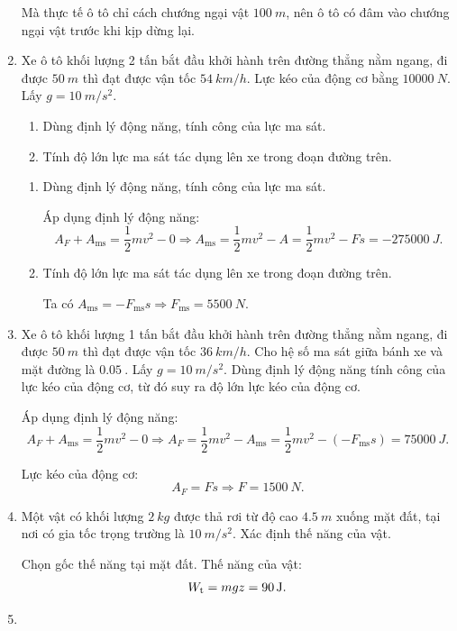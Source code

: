 \begin{enumerate}[label=\bfseries Câu \arabic*:]
{		Mà thực tế ô tô chỉ cách chướng ngại vật $\SI{100}{m}$, nên ô tô có đâm vào chướng ngại vật trước khi kịp dừng lại.
	}
	\item {}
	
	
	{
		Xe ô tô khối lượng 2 tấn bắt đầu khởi hành trên đường thẳng nằm ngang, đi được $\SI{50}{m}$ thì đạt được vận tốc $\SI{54}{km/h}$. Lực kéo của động cơ bằng $\SI{10000}{N}$. Lấy $g=\SI{10}{m/s^2}$.
		\begin{enumerate}[label=\alph*)]
			\item Dùng định lý động năng, tính công của lực ma sát.
			\item Tính độ lớn lực ma sát tác dụng lên xe trong đoạn đường trên.
		\end{enumerate}
	}
	
	\hideall
	{	
		\begin{enumerate}[label=\alph*)]
			\item Dùng định lý động năng, tính công của lực ma sát.
			
			Áp dụng định lý động năng:
			$$A_F + A_\text{ms} = \dfrac{1}{2}mv^2 - 0 \Rightarrow A_\text{ms} = \dfrac{1}{2}mv^2 - A= \dfrac{1}{2} mv^2 - Fs= \SI{-275000}{J}.$$
			\item Tính độ lớn lực ma sát tác dụng lên xe trong đoạn đường trên.
			
			Ta có $A_\text{ms} = -F_\text{ms} s \Rightarrow F_\text{ms} = \SI{5500}{N}$.
		\end{enumerate}
	}
	\item {}
	
	
	{
			Xe ô tô khối lượng 1 tấn bắt đầu khởi hành trên đường thẳng nằm ngang, đi được $\SI{50}{m}$ thì đạt được vận tốc $\SI{36}{km/h}$. Cho hệ số ma sát giữa bánh xe và mặt đường là $\SI{0.05}{}$. Lấy $g=\SI{10}{m/s^2}$. Dùng định lý động năng tính công của lực kéo của động cơ, từ đó suy ra độ lớn lực kéo của động cơ.
	}
	
	\hideall
	{	
		Áp dụng định lý động năng:
		$$A_F + A_\text{ms} = \dfrac{1}{2}mv^2 - 0 \Rightarrow A_F = \dfrac{1}{2}mv^2 - A_\text{ms} = \dfrac{1}{2}mv^2 - (-F_\text{ms}s) = \SI{75000}{J}.$$
		
		Lực kéo của động cơ:
		$$A_F=Fs \Rightarrow F = \SI{1500}{N}.$$
	}
	\item {}
	
	
	{
		Một vật có khối lượng $\SI{2}{kg}$ được thả rơi từ độ cao $\SI{4.5}{m}$ xuống mặt đất, tại nơi có gia tốc trọng trường là $\SI{10}{m/s^2}$. Xác định thế năng của vật.
	}
	
	\hideall
	{	
		Chọn gốc thế năng tại mặt đất. Thế năng của vật:
		$$W_\text t = mgz = \SI{90}{J}.$$
	}
	\item {}
	

\end{enumerate}
